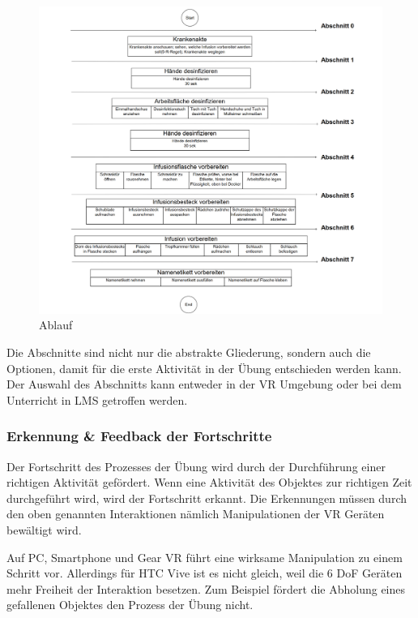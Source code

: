   \begin{figure}[ht]
  \begin{minipage}[t]{1\linewidth}
  \centering
  \includegraphics[width=\textwidth]{images/infusion_vorbereitung_durchlauf.png}
  \caption[Skillslab WebVR]{Ablauf}
  \end{minipage}
  \end{figure}
  
  Die Abschnitte sind nicht nur die abstrakte Gliederung, sondern auch die Optionen, damit für die erste Aktivität in der Übung entschieden werden kann. Der Auswahl des Abschnitts kann entweder in der VR Umgebung oder bei dem Unterricht in LMS getroffen werden.
  
  \subsubsection{Erkennung \& Feedback der Fortschritte}
  Der Fortschritt des Prozesses der Übung wird durch der Durchführung einer richtigen Aktivität gefördert. Wenn eine Aktivität des Objektes zur richtigen Zeit durchgeführt wird, wird der Fortschritt erkannt. Die Erkennungen müssen durch den oben genannten Interaktionen nämlich Manipulationen der VR Geräten bewältigt wird.
  
  Auf PC, Smartphone und Gear VR führt eine wirksame Manipulation zu einem Schritt vor. Allerdings für HTC Vive ist es nicht gleich, weil die 6 DoF Geräten mehr Freiheit der Interaktion besetzen. Zum Beispiel fördert die Abholung eines gefallenen Objektes den Prozess der Übung nicht. 
  
